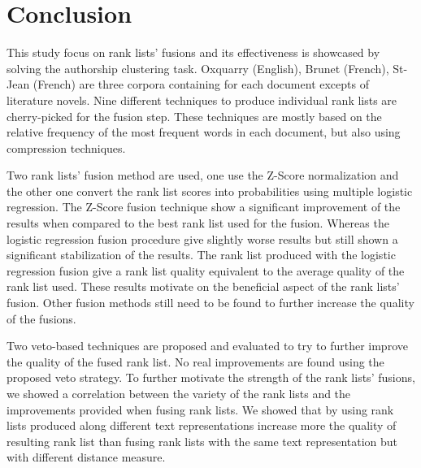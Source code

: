 \chapter{Conclusion \label{sec:conclusion}}

This study focus on rank lists' fusions and its effectiveness is showcased by solving the authorship clustering task.
Oxquarry (English), Brunet (French), St-Jean (French) are three corpora containing for each document excepts of literature novels.
Nine different techniques to produce individual rank lists are cherry-picked for the fusion step.
These techniques are mostly based on the relative frequency of the most frequent words in each document, but also using compression techniques.

Two rank lists' fusion method are used, one use the Z-Score normalization and the other one convert the rank list scores into probabilities using multiple logistic regression.
The Z-Score fusion technique show a significant improvement of the results when compared to the best rank list used for the fusion.
Whereas the logistic regression fusion procedure give slightly worse results but still shown a significant stabilization of the results.
The rank list produced with the logistic regression fusion give a rank list quality equivalent to the average quality of the rank list used.
These results motivate on the beneficial aspect of the rank lists' fusion.
Other fusion methods still need to be found to further increase the quality of the fusions.

Two veto-based techniques are proposed and evaluated to try to further improve the quality of the fused rank list.
No real improvements are found using the proposed veto strategy.
To further motivate the strength of the rank lists' fusions, we showed a correlation between the variety of the rank lists and the improvements provided when fusing rank lists.
We showed that by using rank lists produced along different text representations increase more the quality of resulting rank list than fusing rank lists with the same text representation but with different distance measure.

